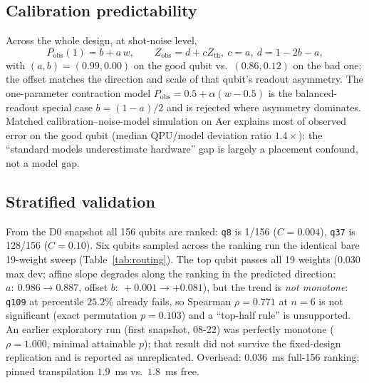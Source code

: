 \documentclass[journal,10pt,twocolumn]{IEEEtran}
\newcommand{\q}[1]{\texttt{q#1}}
\begin{document}
\subsection{Calibration predictability}
Across the whole design, at shot-noise level,
\begin{equation}
P_{\mathrm{obs}}(1)=b+a\,w,\qquad Z_{\mathrm{obs}}=d+cZ_{\mathrm{th}},\ c{=}a,\ d{=}1{-}2b{-}a,
\label{eq:channel}
\end{equation}
with $(a,b){=}(0.99,0.00)$ on the good qubit vs.\ $(0.86,0.12)$ on the bad one; the offset matches the direction
and scale of that qubit's readout asymmetry. The one-parameter contraction model $P_{\mathrm{obs}}=0.5+\alpha(w-0.5)$
is the balanced-readout special case $b{=}(1-a)/2$ and is rejected where asymmetry dominates. Matched
calibration--noise-model simulation on Aer explains most of observed error on the good qubit (median
QPU/model deviation ratio $1.4\times$): the ``standard models underestimate hardware'' gap is largely a placement
confound, not a model gap.

\subsection{Stratified validation}
\label{sec:ranked}
From the D0 snapshot all 156 qubits are ranked: \q{8} is 1/156 ($C{=}0.004$), \q{37} is 128/156 ($C{=}0.10$).
Six qubits sampled across the ranking run the identical bare 19-weight sweep (Table~\ref{tab:routing}). The top
qubit passes all 19 weights ($0.030$ max dev; affine slope degrades along the ranking in the predicted direction:
$a{:}\ 0.986{\to}0.887$, offset $b{:}\ +0.001{\to}+0.081$), but the trend is \emph{not monotone}: \q{109} at
percentile $25.2\%$ already fails, so Spearman $\rho{=}0.771$ at $n{=}6$ is not significant (exact permutation
$p{=}0.103$) and a ``top-half rule'' is unsupported. An earlier exploratory run (first snapshot, 08-22) was
perfectly monotone ($\rho{=}1.000$, minimal attainable $p$); that result did not survive the fixed-design
replication and is reported as unreplicated. Overhead: $0.036$~ms full-156 ranking; pinned transpilation $1.9$~ms
vs.\ $1.8$~ms free.
\end{document}
